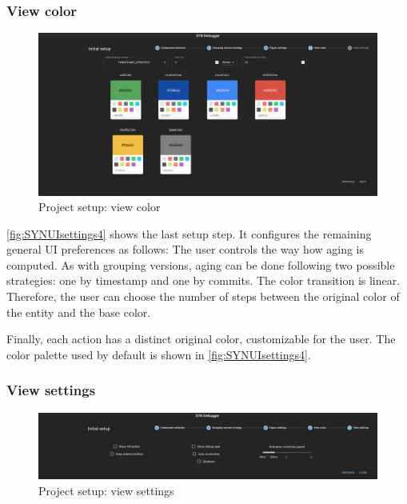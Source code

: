 \subsubsection{View color}

\begin{figure}[h]
    \center
    \includegraphics[width=\textwidth]{SYNUI-settings4.png}
    \caption{Project setup: view color}
    \label{fig:SYNUIsettings4}
\end{figure}

\autoref{fig:SYNUIsettings4} shows the last setup step. It configures the remaining general UI preferences as follows:
The user controls the way how aging is computed. 
As with grouping versions, aging can be done following two possible strategies: one by timestamp and one by commits. 
The color transition is linear. Therefore, the user can choose the number of steps between the original color of the entity and the base color. 

Finally, each action has a distinct original color, customizable for the user. The color palette used by default is shown in \autoref{fig:SYNUIsettings4}.



\subsubsection{View settings}

\begin{figure}[h]
    \center
    \includegraphics[width=\textwidth]{SYNUI-settings5.png}
    \caption{Project setup: view settings}
    \label{fig:SYNUIsettings5}
\end{figure}


